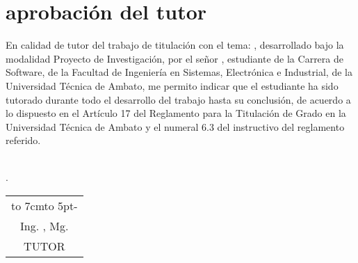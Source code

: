 \newpage
\chapter*{aprobación del tutor}

En calidad de tutor del trabajo de titulación con el tema:
{\MakeUppercase\tema},
desarrollado bajo
la modalidad Proyecto de Investigación, por el señor \autor,
estudiante de la Carrera de Software, de la Facultad de Ingeniería en Sistemas, Electrónica e Industrial, de la
Universidad Técnica de Ambato, me permito indicar que el estudiante ha sido tutorado
durante todo el desarrollo del trabajo hasta su conclusión, de acuerdo a lo dispuesto en
el Artículo 17 del Reglamento para la Titulación de Grado en la Universidad Técnica
de Ambato y el numeral 6.3 del instructivo del reglamento referido.
\\
\\
\begin{flushright}
	\lugarFechaPrelims.
\end{flushright}

\vspace*{5cm}
\begin{center}
	\begin{tabular}{c}
		\hbox to 7cm{\leaders\hbox to 5pt{\hss - \hss}\hfil} \\
		Ing. \tutor, Mg.                                     \\
		TUTOR
	\end{tabular}
\end{center}
